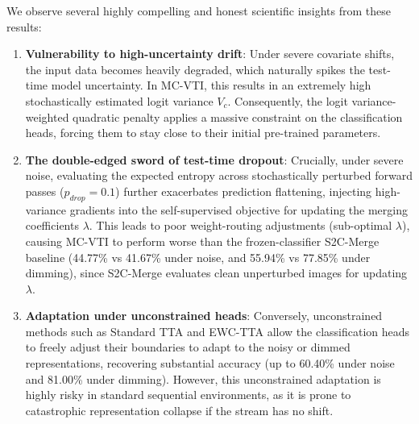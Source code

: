 \documentclass{article}
\theoremstyle{plain}
\theoremstyle{definition}
\theoremstyle{remark}
\begin{document}
We observe several highly compelling and honest scientific insights from these results:
\begin{enumerate}
  \item \textbf{Vulnerability to high-uncertainty drift}: Under severe covariate shifts, the input data becomes heavily degraded, which naturally spikes the test-time model uncertainty. In MC-VTI, this results in an extremely high stochastically estimated logit variance $V_c$. Consequently, the logit variance-weighted quadratic penalty applies a massive constraint on the classification heads, forcing them to stay close to their initial pre-trained parameters.
  \item \textbf{The double-edged sword of test-time dropout}: Crucially, under severe noise, evaluating the expected entropy across stochastically perturbed forward passes ($p_{drop}=0.1$) further exacerbates prediction flattening, injecting high-variance gradients into the self-supervised objective for updating the merging coefficients $\lambda$. This leads to poor weight-routing adjustments (sub-optimal $\lambda$), causing MC-VTI to perform worse than the frozen-classifier S2C-Merge baseline (44.77\% vs 41.67\% under noise, and 55.94\% vs 77.85\% under dimming), since S2C-Merge evaluates clean unperturbed images for updating $\lambda$.
  \item \textbf{Adaptation under unconstrained heads}: Conversely, unconstrained methods such as Standard TTA and EWC-TTA allow the classification heads to freely adjust their boundaries to adapt to the noisy or dimmed representations, recovering substantial accuracy (up to 60.40\% under noise and 81.00\% under dimming). However, this unconstrained adaptation is highly risky in standard sequential environments, as it is prone to catastrophic representation collapse if the stream has no shift.
\end{enumerate}
\end{document}
